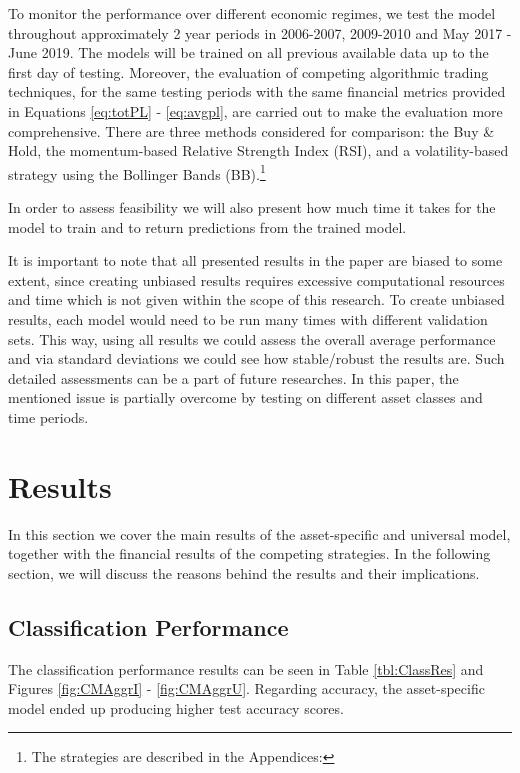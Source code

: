 \documentclass[11pt, a4paper]{article}
\begin{document}
To monitor the performance over different economic regimes, we test the model throughout approximately 2 year periods in 2006-2007, 2009-2010 and May 2017 - June 2019. The models will be trained on all previous available data up to the first day of testing. 
Moreover, the evaluation of competing algorithmic trading techniques, for the same testing periods with the same financial metrics provided in Equations \ref{eq:totPL} - \ref{eq:avgpl}, are carried out to make the evaluation more comprehensive.
There are three methods considered for comparison: the Buy \& Hold, the momentum-based Relative Strength Index (RSI), and a volatility-based strategy using the Bollinger Bands (BB).\footnote{The strategies are described in the Appendices: }

In order to assess feasibility we will also present how much time it takes for the model to train and to return predictions from the trained model.

It is important to note that all presented results in the paper are biased to some extent, since creating unbiased results requires excessive computational resources and time which is not given within the scope of this research. To create unbiased results, each model would need to be run many times with different validation sets. This way, using all results we could assess the overall average performance and via standard deviations we could see how stable/robust the results are. Such detailed assessments can be a part of future researches. In this paper, the mentioned issue is partially overcome by testing on different asset classes and time periods.

\section{Results}
\label{sec:ER}

In this section we cover the main results of the asset-specific and universal model, together with the financial results of the competing strategies. In the following section, we will discuss the reasons behind the results and their implications.

\subsection{Classification Performance}
\label{subsec:ER:ClassPerf}

The classification performance results can be seen in Table \ref{tbl:ClassRes} and Figures \ref{fig:CMAggrI} - \ref{fig:CMAggrU}.
Regarding accuracy, the asset-specific model ended up producing higher test accuracy scores. 
\end{document}
